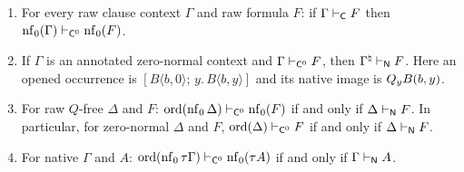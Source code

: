 \begin{theorem}
\label{claus:thm:zero}
\begin{enumerate}[label=(\roman*)]
\item For every raw clause context $\Gamma$ and raw formula $F$: if
$\Gamma\vdash_{\mathsf{C}}F$ then
$\operatorname{nf}_0(\Gamma)\vdash_{\mathsf{C}^{0}}\operatorname{nf}_0(F)$.
\item If $\Gamma$ is an annotated zero-normal context and
$\Gamma\vdash_{\mathsf{C}^{0}}F$, then $\Gamma^{\natural}\vdash_{\mathsf{N}}F$.
Here an opened occurrence is
$[B\langle b,0\rangle;\,y.\,B\langle b,y\rangle]$ and its native image is
$Q_{y}B(b,y)$.
\item For raw $Q$-free $\Delta$ and $F$:
$\operatorname{ord}(\operatorname{nf}_0\Delta)\vdash_{\mathsf{C}^{0}}\operatorname{nf}_0(F)$ if and only
if $\Delta\vdash_{\mathsf{N}}F$. In particular, for zero-normal $\Delta$ and
$F$, $\operatorname{ord}(\Delta)\vdash_{\mathsf{C}^{0}}F$ if and only if
$\Delta\vdash_{\mathsf{N}}F$.
\item For native $\Gamma$ and $A$:
$\operatorname{ord}(\operatorname{nf}_0\tau\Gamma)\vdash_{\mathsf{C}^{0}}\operatorname{nf}_0(\tau A)$ if
and only if $\Gamma\vdash_{\mathsf{N}}A$.
\end{enumerate}
\end{theorem}
